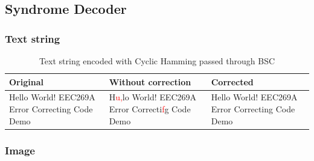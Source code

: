 \documentclass{article}
\begin{document}
\subsection{Syndrome Decoder}
\subsubsection{Text string}

\begin{table}[htb]
    \centering
    \caption{Text string encoded with Cyclic Hamming passed through BSC}
    \label{tab:text-cyclic-bsc}
    \renewcommand{\arraystretch}{1.5}
    \begin{tabulary}{\textwidth}{ |L|L|L| } 
    \hline
    \textbf{Original} & \textbf{Without correction} & \textbf{Corrected} \\
    \hline
    Hello World! EEC269A Error Correcting Code Demo & H\textcolor{red}{u,}lo World! EEC269A Error Correcti\textcolor{red}{f}g Code Demo & Hello World! EEC269A Error Correcting Code Demo \\
    \hline
    \end{tabulary}
\end{table}



\subsubsection{Image}
\end{document}
